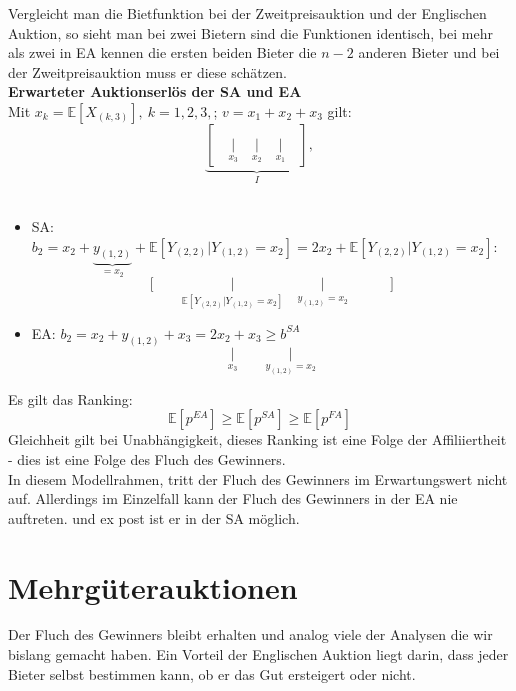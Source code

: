 \documentclass[12pt]{extreport} %
\theoremstyle{named}
\theoremstyle{itshape}
\theoremstyle{normal}
\begin{document}
Vergleicht man die Bietfunktion bei der Zweitpreisauktion und der Englischen Auktion, so sieht man bei zwei Bietern sind die Funktionen identisch, bei mehr als zwei in EA kennen die ersten beiden Bieter die $n-2$ anderen Bieter und bei der Zweitpreisauktion muss er diese schätzen. ~\\


\textbf{Erwarteter Auktionserlös der SA und EA} ~\\
Mit $x_{k} = \mathds{E}\left[ X_{(k, 3)} \right], ~ k =1,2,3,$;  $v = x_1 + x_2 + x_3$ gilt:
$$ \underbrace{\left[ \quad \underset{x_3}{\Big|} \quad \underset{x_2}{\Big|} \quad \underset{x_1}{\Big|} \quad \right]}_{I},  $$ ~\\

\begin{itemize}
	\item SA: $b_2 = x_2 + \underbrace{y_{(1,2)}}_{=x_2} + \mathds{E}\left[ Y_{(2,2)} \big| Y_{(1,2)} = x_{2} \right] = 2 x_{2} + \mathds{E}\left[ Y_{(2,2)} \big| Y_{(1,2)}= x_{2} \right]$:
		$$ \Bigg[ \qquad \underset{\mathds{E}\left[Y_{(2,2)} \Big| Y_{(1,2)} = x_{2} \right]}{\Big|} \quad \underset{y_{(1,2)} = x_2}{\underset{~}{\Big|}} \qquad \quad \Bigg] $$
	\item EA: $b_2 = x_2 + y_{(1,2)} + x_{3} = 2x_{2} + x_{3} \geq b^{SA}$
		$$  \underset{x_{3}}{\Big|} \qquad \underset{y_{(1,2)}=x_2}{\Big|} $$
\end{itemize}

Es gilt das Ranking:
$$ \mathds{E}\left[ p^{EA} \right] \geq \mathds{E}\left[ p^{SA} \right] \geq \mathds{E}\left[ p^{FA} \right] $$
Gleichheit gilt bei Unabhängigkeit, dieses Ranking ist eine Folge der Affiliiertheit - dies ist eine Folge des Fluch des Gewinners. ~\\

In diesem Modellrahmen, tritt der Fluch des Gewinners im Erwartungswert nicht auf. Allerdings im Einzelfall kann der Fluch des Gewinners in der EA nie auftreten. und ex post ist er in der SA möglich.


\chapter{Mehrgüterauktionen}


Der Fluch des Gewinners bleibt erhalten und analog viele der Analysen die wir bislang gemacht haben. Ein Vorteil der Englischen Auktion liegt darin, dass jeder Bieter selbst bestimmen kann, ob er das Gut ersteigert oder nicht. ~\\
\end{document}
